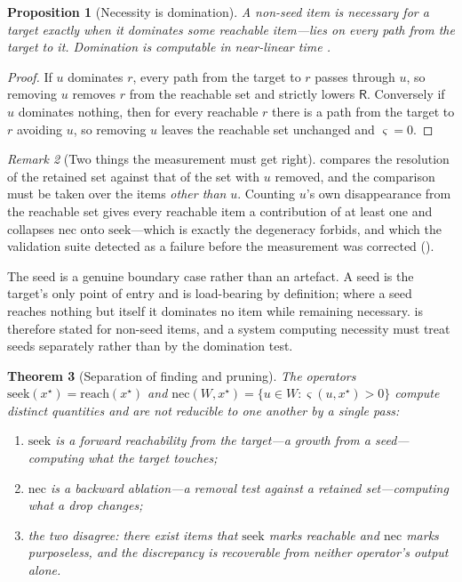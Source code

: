 \documentclass[11pt,twocolumn,a4paper]{article}
\theoremstyle{dirthm}
\newtheorem{theorem}{Theorem}[section]
\newtheorem{proposition}[theorem]{Proposition}
\theoremstyle{definition}
\theoremstyle{remark}
\newtheorem{remark}[theorem]{Remark}
\newcommand{\reach}{\mathrm{reach}}
\newcommand{\nec}{\mathrm{nec}}
\newcommand{\seek}{\mathrm{seek}}
\newcommand{\Res}{\mathsf{R}}
\newcommand{\set}[1]{\{#1\}}
\begin{document}
\begin{proposition}[Necessity is domination]
\label{prop:domination}
A non-seed item is necessary for a target exactly when it \emph{dominates}
some reachable item---lies on every path from the target to it. Domination is
computable in near-linear time \citep{lengauer1979}.
\end{proposition}

\begin{proof}
If $u$ dominates $r$, every path from the target to $r$ passes through $u$, so
removing $u$ removes $r$ from the reachable set and strictly lowers
$\Res$. Conversely if $u$ dominates nothing, then for every reachable $r$
there is a path from the target to $r$ avoiding $u$, so removing $u$ leaves
the reachable set unchanged and $\varsigma=0$.
\end{proof}

\begin{remark}[Two things the measurement must get right]
\label{rem:contribution-care}
 compares the resolution of the retained set against
that of the set with $u$ removed, and the comparison must be taken over the
items \emph{other than} $u$. Counting $u$'s own disappearance from the
reachable set gives every reachable item a contribution of at least one and
collapses $\nec$ onto $\seek$---which is exactly the degeneracy
 forbids, and which the validation suite
detected as a failure before the measurement was corrected
().

The seed is a genuine boundary case rather than an artefact. A seed is the
target's only point of entry and is load-bearing by definition; where a seed
reaches nothing but itself it dominates no item while remaining necessary.
 is therefore stated for non-seed items, and a system
computing necessity must treat seeds separately rather than by the domination
test.
\end{remark}

\begin{theorem}[Separation of finding and pruning]
\label{thm:separation-operators}
The operators $\seek(x^{\star})=\reach(x^{\star})$ and
$\nec(W,x^{\star})=\set{u\in W:\varsigma(u,x^{\star})>0}$ compute distinct
quantities and are not reducible to one another by a single pass:
\begin{enumerate}[label=\textup{(\roman*)},leftmargin=2.0em,itemsep=1pt]
\item $\seek$ is a forward reachability from the target---a growth from a
seed---computing what the target \emph{touches};
\item $\nec$ is a backward ablation---a removal test against a retained
set---computing what a drop \emph{changes};
\item the two disagree: there exist items that $\seek$ marks reachable and
$\nec$ marks purposeless, and the discrepancy is recoverable from neither
operator's output alone.
\end{enumerate}
\end{theorem}
\end{document}
